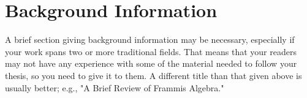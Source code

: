 \chapter{Background Information}
\label{ch:background}

A brief section giving background information may be necessary, especially if
your work spans two or more traditional fields. That means that your readers may
not have any experience with some of the material needed to follow your thesis,
so you need to give it to them. A different title than that given above is
usually better; e.g., "A Brief Review of Frammis Algebra."